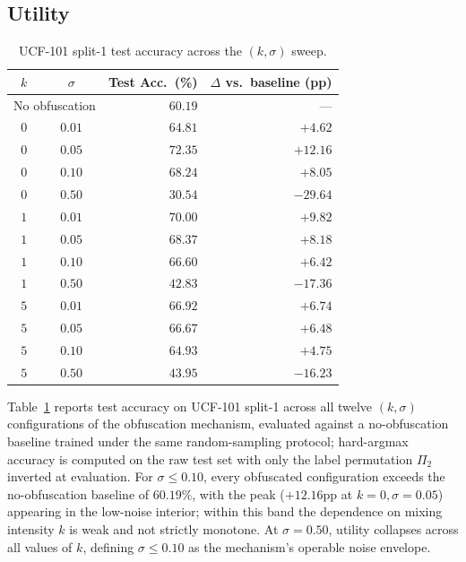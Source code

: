 \documentclass[letterpaper]{article} %
\begin{document}
\subsection{Utility}
\label{subsec:utility}

\begin{table}[t]
\centering\small
\caption{UCF-101 split-1 test accuracy across the $(k, \sigma)$ sweep.}
\label{tab:utility}
\begin{tabular}{ccrr}
\toprule
$k$ & $\sigma$ & Test Acc.\ (\%) & $\Delta$ vs.\ baseline (pp) \\
\midrule
\multicolumn{2}{c}{No obfuscation} & $60.19$ & --- \\
\midrule
$0$ & $0.01$ & $64.81$ & $+4.62$  \\
$0$ & $0.05$ & $72.35$ & $+12.16$ \\
$0$ & $0.10$ & $68.24$ & $+8.05$  \\
$0$ & $0.50$ & $30.54$ & $-29.64$ \\
\midrule
$1$ & $0.01$ & $70.00$ & $+9.82$  \\
$1$ & $0.05$ & $68.37$ & $+8.18$  \\
$1$ & $0.10$ & $66.60$ & $+6.42$  \\
$1$ & $0.50$ & $42.83$ & $-17.36$ \\
\midrule
$5$ & $0.01$ & $66.92$ & $+6.74$  \\
$5$ & $0.05$ & $66.67$ & $+6.48$  \\
$5$ & $0.10$ & $64.93$ & $+4.75$  \\
$5$ & $0.50$ & $43.95$ & $-16.23$ \\
\bottomrule
\end{tabular}
\end{table}

Table~\ref{tab:utility} reports test accuracy on UCF-101 split-1 across all twelve $(k, \sigma)$ configurations of the obfuscation mechanism, evaluated against a no-obfuscation baseline trained under the same random-sampling protocol; hard-argmax accuracy is computed on the raw test set with only the label permutation $\Pi_2$ inverted at evaluation. For $\sigma \le 0.10$, every obfuscated configuration exceeds the no-obfuscation baseline of $60.19\%$, with the peak ($+12.16$pp at $k = 0, \sigma = 0.05$) appearing in the low-noise interior; within this band the dependence on mixing intensity $k$ is weak and not strictly monotone. At $\sigma = 0.50$, utility collapses across all values of $k$, defining $\sigma \le 0.10$ as the mechanism's operable noise envelope.
\end{document}
